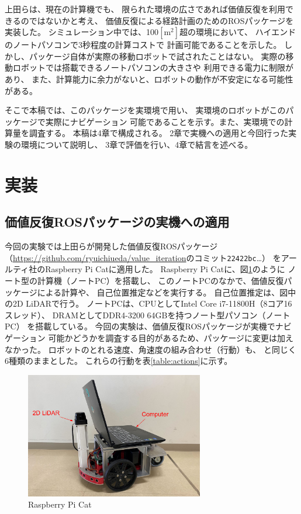 \documentclass{jarticle}
\begin{document}
上田らは、現在の計算機でも、
限られた環境の広さであれば価値反復を利用できるのではないかと考え、
価値反復による経路計画のためのROSパッケージを実装した\cite{上田rsj2021}。
シミュレーション中では、100$\mathrm{[m^2]}$超の環境において、
ハイエンドのノートパソコンで3秒程度の計算コストで
計画可能であることを示した。
しかし、パッケージ自体が実際の移動ロボットで試されたことはない。
実際の移動ロボットでは搭載できるノートパソコンの大きさや
利用できる電力に制限があり、
また、計算能力に余力がないと、ロボットの動作が不安定になる可能性がある。

そこで本稿では、このパッケージを実環境で用い、
実環境のロボットがこのパッケージで実際にナビゲーション
可能であることを示す。また、実環境での計算量を調査する。
本稿は4章で構成される。
2章で実機への適用と今回行った実験の環境について説明し、
3章で評価を行い、4章で結言を述べる。

\section{実装}%

\subsection{価値反復ROSパッケージの実機への適用}

今回の実験では上田らが開発した価値反復ROSパッケージ
（\url{https://github.com/ryuichiueda/value_iteration}のコミット\texttt{22422bc}\dots）
\cite{上田rsj2021}をアールティ社のRaspberry Pi Catに適用した。
Raspberry Pi Catに、図\ref{fig:raspicat}のように
ノート型の計算機（ノートPC）を搭載し、
このノートPCのなかで、価値反復パッケージによる計算や、
自己位置推定などを実行する。
自己位置推定は、図中の2D LiDARで行う。
ノートPCは、CPUとしてIntel Core i7-11800H（8コア16スレッド）、
DRAMとしてDDR4-3200 64GBを持つノート型パソコン（ノートPC）
を搭載している。
今回の実験は、価値反復ROSパッケージが実機でナビゲーション
可能かどうかを調査する目的があるため、パッケージに変更は加えなかった。
ロボットのとれる速度、角速度の組み合わせ（行動）も、
\cite{上田rsj2021}と同じく6種類のままとした。
これらの行動を表\ref{table:actions}に示す。

\begin{figure}[htb]
  \centering
   \includegraphics[height=55mm]{./figs/raspicat.png}
   \caption{Raspberry Pi Cat}
	\label{fig:raspicat}
\end{figure}
\end{document}

